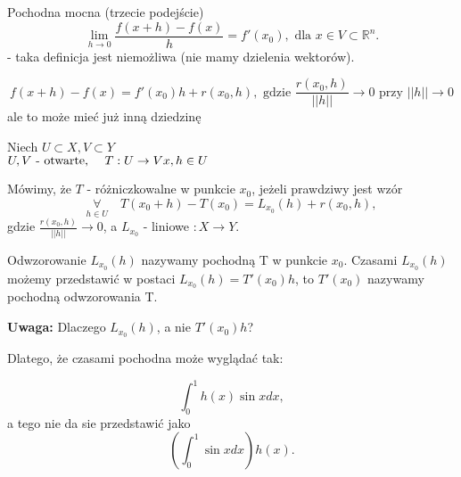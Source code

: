 \documentclass[../main.tex]{subfiles}
\begin{document}
\begin{definicja}
    Pochodna mocna (trzecie podejście)
\[
 \lim\limits_{h \to 0}\frac{f(x+h) - f(x)}{h} = f'(x_0), \text{ dla }x\in V\subset \mathbb{R}^{n}
 .\]
 - taka definicja jest niemożliwa (nie mamy dzielenia wektorów).
\end{definicja}


\[
    f(x+h)-f(x)=f'(x_0) h + r(x_0,h), \text{ gdzie } \frac{r(x_0,h)}{||h||}\to 0 \text{ przy } ||h||\to 0
\]
ale to może mieć już inną dziedzinę

\begin{definicja}

    Niech $U \subset X, V\subset Y$\\
    $U,V\text{ - otwarte, }\quad T:U\to V\\
    x,h\in U$

    Mówimy, że $T$ - różniczkowalne w punkcie $x_0$, jeżeli prawdziwy jest wzór
    \[
        \underset{h\in U}{\forall} \quad T(x_0+h) - T(x_0) = L_{x_0} (h) + r(x_0,h),
    \]
    gdzie $\frac{r(x_0,h)}{||h||}\to 0$, a $L_{x_0}$ - liniowe $: X\to Y$.
\end{definicja}


\vspace{0.3cm}
Odwzorowanie $L_{x_0} (h)$ nazywamy pochodną T w punkcie $x_0$.
Czasami $L_{x_0}(h)$ możemy przedstawić w postaci $L_{x_0} (h) = T'(x_0) h$, to $T'(x_0)$ nazywamy pochodną odwzorowania T.

\vspace{0.3cm}
\textbf{Uwaga:} Dlaczego $L_{x_0}(h)$, a nie $T'(x_0) h$?
\vspace{0.3cm}

Dlatego, że czasami pochodna może wyglądać tak:

\[
    \int_0^1 h(x)\sin{x}dx
,\]
a tego nie da sie przedstawić jako
\[
    \left ( \int_0^1 \sin{x}dx \right ) h(x).
\]
\end{document}
